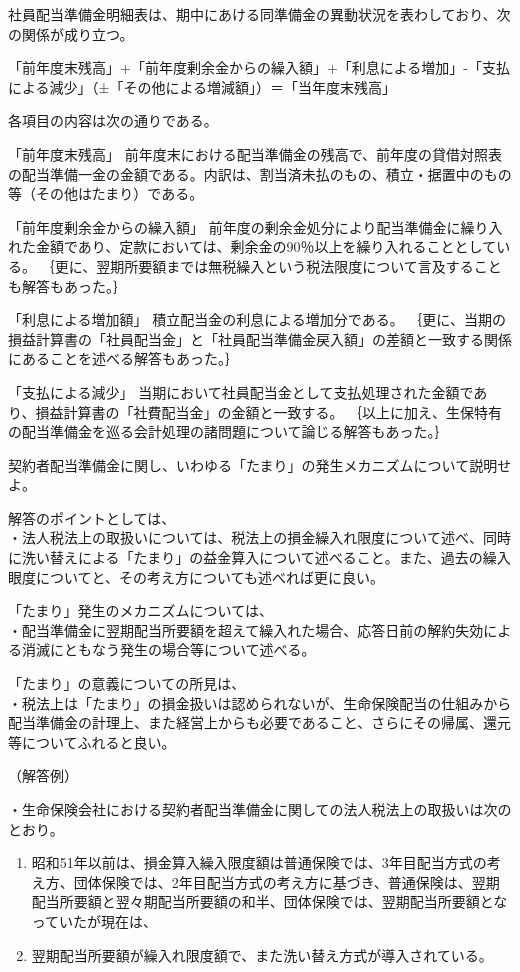 \documentclass[report,gutter=10mm,fore-edge=10mm,uplatex,dvipdfmx]{jlreq}
\begin{document}

社員配当準備金明細表は、期中にあける同準備金の異動状況を表わしており、次の関係が成り立つ。

「前年度末残高」+「前年度剰余金からの繰入額」+「利息による増加」-「支払による減少」（±「その他による増減額」）＝「当年度末残高」

各項目の内容は次の通りである。

「前年度末残高」 前年度末における配当準備金の残高で、前年度の貸借対照表の配当準備一金の金額である。内訳は、割当済未払のもの、積立・据置中のもの等（その他はたまり）である。

「前年度剰余金からの繰入額」 前年度の剰余金処分により配当準備金に繰り入れた金額であり、定款においては、剰余金の90％以上を繰り入れることとしている。
｛更に、翌期所要額までは無税繰入という税法限度について言及することも解答もあった。｝

「利息による増加額」 積立配当金の利息による増加分である。
｛更に、当期の損益計算書の「社員配当金」と「社員配当準備金戻入額」の差額と一致する関係にあることを述べる解答もあった。｝

「支払による減少」 当期において社員配当金として支払処理された金額であり、損益計算書の「社費配当金」の金額と一致する。
｛以上に加え、生保特有の配当準備金を巡る会計処理の諸問題について論じる解答もあった。｝


契約者配当準備金に関し、いわゆる「たまり」の発生メカニズムについて説明せよ。


解答のポイントとしては、\\
・法人税法上の取扱いについては、税法上の損金繰入れ限度について述べ、同時に洗い替えによる「たまり」の益金算入について述べること。また、過去の繰入眼度についてと、その考え方についても述べれば更に良い。

「たまり」発生のメカニズムについては、\\
・配当準備金に翌期配当所要額を超えて繰入れた場合、応答日前の解約失効による消滅にともなう発生の場合等について述べる。

「たまり」の意義についての所見は、\\
・税法上は「たまり」の損金扱いは認められないが、生命保険配当の仕組みから配当準備金の計理上、また経営上からも必要であること、さらにその帰属、還元等についてふれると良い。

（解答例）

・生命保険会社における契約者配当準備金に関しての法人税法上の取扱いは次のとおり。
\begin{enumerate} [1) ]
\item 昭和51年以前は、損金算入繰入限度額は普通保険では、3年目配当方式の考え方、団体保険では、2年目配当方式の考え方に基づき、普通保険は、翌期配当所要額と翌々期配当所要額の和半、団体保険では、翌期配当所要額となっていたが現在は、
\item 翌期配当所要額が繰入れ限度額で、また洗い替え方式が導入されている。
\end{enumerate}
\end{document}
